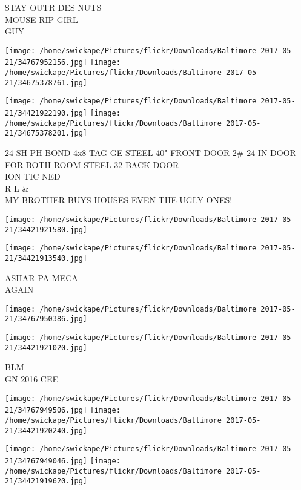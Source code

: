 \documentclass[10pt,letterpaper]{article}
\begin{document}
STAY OUTR DES NUTS\\
MOUSE RIP GIRL\\
GUY\\
\pagebreak

\texttt{[image: /home/swickape/Pictures/flickr/Downloads/Baltimore 2017-05-21/34767952156.jpg]}
\texttt{[image: /home/swickape/Pictures/flickr/Downloads/Baltimore 2017-05-21/34675378761.jpg]}

\texttt{[image: /home/swickape/Pictures/flickr/Downloads/Baltimore 2017-05-21/34421922190.jpg]}
\texttt{[image: /home/swickape/Pictures/flickr/Downloads/Baltimore 2017-05-21/34675378201.jpg]}

24 SH PH BOND 4x8 TAG GE STEEL 40" FRONT DOOR 2\# 24 IN DOOR FOR BOTH ROOM STEEL 32 BACK DOOR\\
ION TIC NED\\
R L \&\\
MY BROTHER BUYS HOUSES EVEN THE UGLY ONES!\\
\pagebreak

\texttt{[image: /home/swickape/Pictures/flickr/Downloads/Baltimore 2017-05-21/34421921580.jpg]}

\vspace{0.25in}
\texttt{[image: /home/swickape/Pictures/flickr/Downloads/Baltimore 2017-05-21/34421913540.jpg]}

ASHAR PA MECA\\
AGAIN\\
\pagebreak

\texttt{[image: /home/swickape/Pictures/flickr/Downloads/Baltimore 2017-05-21/34767950386.jpg]}

\vspace{0.25in}
\texttt{[image: /home/swickape/Pictures/flickr/Downloads/Baltimore 2017-05-21/34421921020.jpg]}

BLM\\
GN 2016 CEE\\
\pagebreak

\texttt{[image: /home/swickape/Pictures/flickr/Downloads/Baltimore 2017-05-21/34767949506.jpg]}
\texttt{[image: /home/swickape/Pictures/flickr/Downloads/Baltimore 2017-05-21/34421920240.jpg]}

\texttt{[image: /home/swickape/Pictures/flickr/Downloads/Baltimore 2017-05-21/34767949046.jpg]}
\texttt{[image: /home/swickape/Pictures/flickr/Downloads/Baltimore 2017-05-21/34421919620.jpg]}
\end{document}
